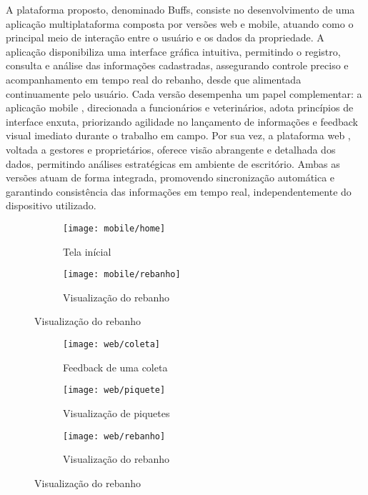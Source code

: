 A plataforma proposto, denominado Buffs, consiste no desenvolvimento de uma aplicação multiplataforma composta por versões web e mobile, atuando como o principal meio de interação entre o usuário e os dados da propriedade. A aplicação disponibiliza uma interface gráfica intuitiva, permitindo o registro, consulta e análise das informações cadastradas, assegurando controle preciso e acompanhamento em tempo real do rebanho, desde que alimentada continuamente pelo usuário. Cada versão desempenha um papel complementar: a aplicação mobile , direcionada a funcionários e veterinários, adota princípios de interface enxuta, priorizando agilidade no lançamento de informações e feedback visual imediato durante o trabalho em campo. Por sua vez, a plataforma web , voltada a gestores e proprietários, oferece visão abrangente e detalhada dos dados, permitindo análises estratégicas em ambiente de escritório. Ambas as versões atuam de forma integrada, promovendo sincronização automática e garantindo consistência das informações em tempo real, independentemente do dispositivo utilizado.

\newpage

\begin{figure}[!h]
\centering
\caption{Telas Aplicativo Mobile}%
\label{fig:mobile}
\begin{subfigure}[b]{0.25\textwidth}
    \centering
    \texttt{[image: mobile/home]}
    \caption{Tela inícial}
    \label{fig:web_coleta}
\end{subfigure}
\hspace{2cm}
\begin{subfigure}[b]{0.25\textwidth}
    \centering
    \texttt{[image: mobile/rebanho]}
    \caption{Visualização do rebanho}
    \label{fig:web_piquete}
\end{subfigure}
\end{figure}


\begin{figure}[!h]
\caption{Exemplos de telas da plataforma web, mostrando indicadores, piquetes e inventário do rebanho}
\centering
\label{fig:web}
\begin{subfigure}[b]{0.424\textwidth}
    \centering
    \texttt{[image: web/coleta]}
    \caption{Feedback de uma coleta}
    \label{fig:web_coleta}
\end{subfigure}
\hfill
\begin{subfigure}[b]{0.424\textwidth}
    \centering
    \texttt{[image: web/piquete]}
    \caption{Visualização de piquetes}
    \label{fig:web_piquete}
\end{subfigure}

\vspace{0.5cm} %

\begin{subfigure}[b]{0.45\textwidth}
    \centering
    \texttt{[image: web/rebanho]}
    \caption{Visualização do rebanho}
    \label{fig:web_rebanho}
\end{subfigure}

\label{fig:web_exemplos}
\end{figure}

